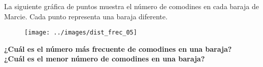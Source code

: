 \question[10] La siguiente gráfica de puntos muestra el número de comodines en cada baraja de Marcie. Cada punto representa una baraja diferente.
\begin{figure}[H]
    \begin{center}
        \texttt{[image: ../images/dist\_frec\_05]}
    \end{center}
    \caption{}
    \label{fig:dist_frec_05}
\end{figure}
\textbf{¿Cuál es el número más frecuente de comodines en una baraja?}\\
\textbf{¿Cuál es el menor número de comodines en una baraja?}